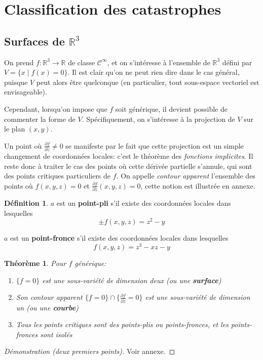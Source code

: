 \documentclass{article}
\newcommand{\cinf}{\mathcal{C}^\infty}
\newcommand{\R}{\mathbb{R}}
\newtheorem{thm}{Théorème}
\theoremstyle{definition}
\newtheorem{defn}{Définition}
\begin{document}
\section{Classification des catastrophes}
\subsection{Surfaces de $\R^3$}

On prend $f: \R^3\to\R$ de classe $\cinf$, et on s'intéresse à l'ensemble de $\R^3$ défini par $V=\{x\mid f(x)=0\}$.
Il est clair qu'on ne peut rien dire dans le cas général, puisque $V$ peut alors être quelconque (en particulier, tout sous-espace vectoriel est envisageable).

Cependant, lorsqu'on impose que $f$ soit générique, il devient possible de commenter la forme de $V$.
Spécifiquement, on s'intéresse à la projection de $V$ sur le plan $(x,y)$.

Un point où $\frac{\partial f}{\partial z}\neq 0$ se manifeste par le fait que cette projection est un simple changement de coordonnées locales: c'est le théorème des \textit{fonctions implicites}.
Il reste donc à traiter le cas des points où cette dérivée partielle s'annule, qui sont des points critiques particuliers de $f$.
On appelle \textit{contour apparent} l'ensemble des points où $f(x,y,z)=0$ et $\frac{\partial f}{\partial z}(x,y,z)=0$, cette notion est illustrée en annexe.
\begin{defn}
	$a$ est un \textbf{point-pli} s'il existe des coordonnées locales dans lesquelles
	$$\pm f(x, y, z) = z^2 - y$$

	$a$ est un \textbf{point-fronce} s'il existe des coordonnées locales dans lesquelles
	$$f(x,y,z) = z^3 - xz - y$$
\end{defn}
\begin{thm}
	Pour $f$ générique:
	\begin{enumerate}
		\item $\{f=0\}$ est une sous-variété de dimension deux (ou une \textbf{surface})
		\item Son contour apparent $\{f=0\}\cap \{\frac{\partial f}{\partial z}=0\}$ est une sous-variété de dimension un (ou une \textbf{courbe})
		\item Tous les points critiques sont des points-plis ou points-fronces, et les points-fronces sont isolés
	\end{enumerate}
\end{thm}
\begin{proof}[Démonstration (deux premiers points)] Voir annexe. \end{proof}
\end{document}
